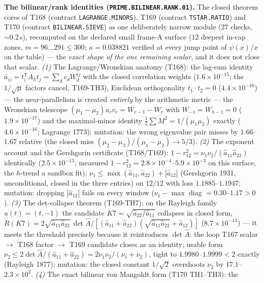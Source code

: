 \documentclass[11pt,a4paper]{article}
\begin{document}
\par\smallskip\noindent\textbf{The bilinear/rank identities
(\texttt{PRIME.BILINEAR.RANK.01}).}
The closed theorem cores of T168 (contract \texttt{LAGRANGE.MINORS}),
T169 (contract \texttt{TSTAR.RATIO}) and T170 (contract
\texttt{BILINEAR.SIEVE}) as one deliberately narrow module ($27$ checks,
${\sim}0.2$\,s), recomputed on the declared small frame-A surface ($12$
deepest in-cap zones, $m=96\ldots291\le300$; $\kappa=0.038821$ verified
at every jump point of $\psi(x)/x$ on the table) --- the \emph{exact
shape of the one remaining scalar}, and it does not close that scalar.
\emph{(1)} The Lagrange/Wronskian anatomy (T168): the lag-sum identity
$\hat a_{ij}=t_i^{\mathsf T}A_ht_j=\sum_d c_dW^{ij}_d$ with the closed
correlation weights ($1.6\times10^{-15}$; the $1/\sqrt{\mu}$ factors
cancel, T169-TH3), Euclidean orthogonality $t_1\cdot t_2=0$
($4.4\times10^{-16}$) --- the near-parallelism is created \emph{entirely}
by the arithmetic metric --- the Wronskian telescope
$(\mu_1-\mu_2)u_rv_r=W_{r-1}-W_r$ with $W_{-1}=W_{h-1}=0$
($1.9\times10^{-17}$) and the maximal-minor identity
$\tfrac12\sum M^2=1/(\mu_1\mu_2)$ exactly ($4.6\times10^{-16}$; Lagrange
1773); mutation: the wrong eigenvalue pair misses by $1.66$--$1.67$
relative (the closed miss $(\mu_2-\mu_3)/(\mu_1-\mu_2)\to5/3$).
\emph{(2)} The exponent account and the Gershgorin certificate
(T168/T169): $1-r_{12}^2=\nu_1\nu_2/(\hat a_{11}\hat a_{22})$
identically ($2.5\times10^{-13}$; measured
$1-r_{12}^2=2.8\times10^{-4}$--$5.9\times10^{-3}$ on this surface, the
$h$-trend a sandbox fit); $\nu_1\le\max(\hat a_{11},\hat a_{22})+
|\hat a_{12}|$ (Gershgorin 1931, unconditional, closed in the three
entries) on $12/12$ with loss $1.1885$--$1.1947$; mutation: dropping
$|\hat a_{12}|$ fails on every window ($\nu_1-\max$ diag
$=0.30$--$1.17>0$).
\emph{(3)} The det-collapse theorem (T169-TH7): on the Rayleigh family
$u(t)=(t,-1)$ the candidate $K7=\sqrt{\hat a_{22}/\hat a_{11}}$
collapses in closed form,
$R(K7)=2\sqrt{\hat a_{11}\hat a_{22}}\,\det\hat A/[(\hat a_{11}+
\hat a_{22})(\sqrt{\hat a_{11}\hat a_{22}}+\hat a_{12})]$
($8.7\times10^{-13}$) --- it meets the threshold precisely because it
reintroduces $\det\hat A$: the loop T167 scalar $\to$ T168 factor $\to$
T169 candidate closes as an identity; usable form
$\nu_2\le2\det\hat A/(\hat a_{11}+\hat a_{22})=2\nu_1\nu_2/(\nu_1+\nu_2)$,
tight to $1.9980$--$1.9999<2$ exactly (Rayleigh 1877); mutation: the
closed constant $1/\sqrt2$ overshoots $\nu_2$ by
$17.1$--$2.3\times10^{2}$.
\emph{(4)} The exact bilinear von Mangoldt form (T170 TH1--TH3): the
\end{document}
